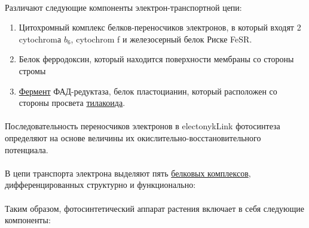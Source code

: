 \paragraph*{}Различают следующие компоненты электрон-транспортной цепи:

\begin{enumerate}
	\item Цитохромный комплекс белков-переносчиков электронов, в который входят 2 \gls{cytochrom}а $b_{6}$, \gls{cytochrom} f и железосерный белок Риске FeSR.
	\item Белок ферродоксин, который находится поверхности мембраны со стороны стромы
	\item \hyperlink{enzimes}{Фермент} ФАД-редуктаза, белок пластоцианин, который расположен со стороны просвета \hyperlink{cell_plastids}{тилакоида}.
\end{enumerate}

\paragraph*{}Последовательность переносчиков электронов в \gls{electonykLink} фотосинтеза определяют на основе величины их окислительно-восстановительного потенциала. 


\paragraph*{}В цепи транспорта электрона выделяют пять \hyperlink{proteins}{белковых комплексов}, дифференцированных структурно и функционально: 

\paragraph*{}Таким образом, фотосинтетический аппарат растения включает в себя следующие компоненты:

